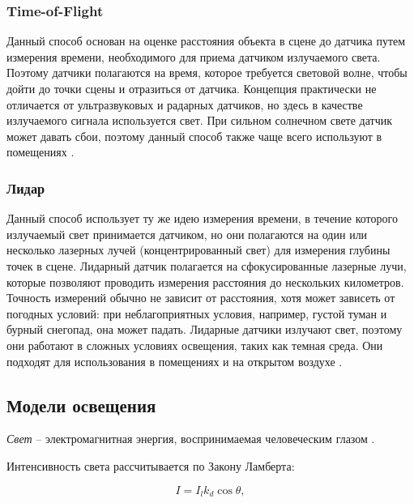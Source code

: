 \subsubsection*{Time-of-Flight}

Данный способ основан на оценке расстояния объекта в сцене до датчика путем измерения времени, необходимого для приема датчиком излучаемого света. Поэтому датчики полагаются на время, которое требуется световой волне, чтобы дойти до точки сцены и отразиться от датчика. Концепция практически не отличается от ультразвуковых и радарных датчиков, но здесь в качестве излучаемого сигнала используется свет. При сильном солнечном свете датчик может давать сбои, поэтому данный способ также чаще всего используют в помещениях \cite{rgbd}.

\subsubsection*{Лидар}

Данный способ использует ту же идею измерения времени, в течение которого излучаемый свет принимается датчиком, но они полагаются на один или несколько лазерных лучей (концентрированный свет) для измерения глубины точек в сцене. Лидарный датчик полагается на сфокусированные лазерные лучи, которые позволяют проводить измерения расстояния до нескольких километров. Точность измерений обычно не зависит от расстояния, хотя может зависеть от погодных условий: при неблагоприятных условия, например, густой туман и бурный снегопад, она может падать. Лидарные датчики излучают свет, поэтому они работают в сложных условиях освещения, таких как темная среда. Они подходят для использования в помещениях и на открытом воздухе \cite{rgbd}.

\subsection{Модели освещения}


\textit{Свет} -- электромагнитная энергия, воспринимаемая человеческим глазом \cite{big_rus_enc}.

Интенсивность света рассчитывается по Закону Ламберта:

\begin{equation}
	I = I_l k_d \cos \theta,
\end{equation}

